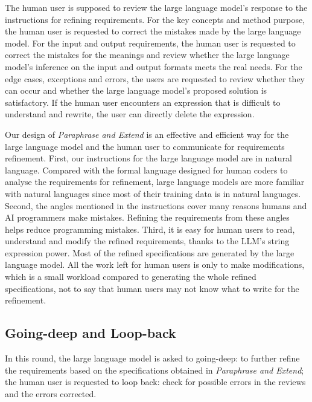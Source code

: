 \documentclass[sigconf]{acmart}
\begin{document}
The human user is supposed to review the large language model's response to the instructions for refining requirements. For the key concepts and method purpose, the human user is requested to correct the mistakes made by the large language model. For the input and output requirements, the human user is requested to correct the mistakes for the meanings and review whether the large language model's inference on the input and output formats meets the real needs. For the edge cases, exceptions and errors, the users are requested to review whether they can occur and whether the large language model's proposed solution is satisfactory. If the human user encounters an expression that is difficult to understand and rewrite, the user can directly delete the expression.

Our design of \textit{Paraphrase and Extend} is an effective and efficient way for the large language model and the human user to communicate for requirements refinement. First, our instructions for the large language model are in natural language. Compared with the formal language designed for human coders to analyse the requirements for refinement, large language models are more familiar with natural languages since most of their training data is in natural languages. Second, the angles mentioned in the instructions cover many reasons humans and AI programmers make mistakes. Refining the requirements from these angles helps reduce programming mistakes. Third, it is easy for human users to read, understand and modify the refined requirements, thanks to the LLM's string expression power. Most of the refined specifications are generated by the large language model. All the work left for human users is only to make modifications, which is a small workload compared to generating the whole refined specifications, not to say that human users may not know what to write for the refinement.   

\subsection{Going-deep and Loop-back}

In this round, the large language model is asked to going-deep: to further refine the requirements based on the specifications obtained in \textit{Paraphrase and Extend}; the human user is requested to loop back: check for possible errors in the reviews and the errors corrected.
\end{document}

